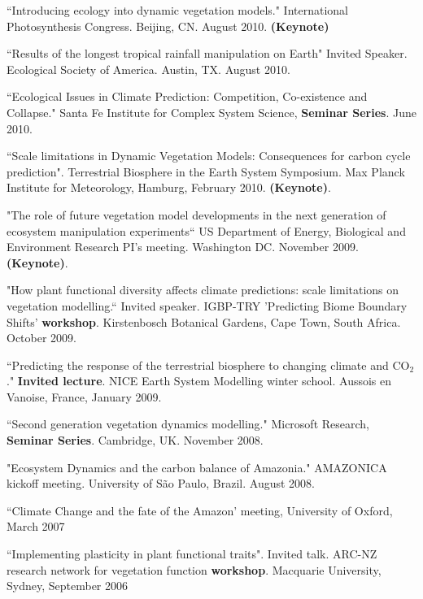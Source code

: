 \documentclass[10pt]{article}
\newenvironment{lonelist}[1][\enskip\textbullet]%
        {\vspace{-\baselineskip}\begin{list}{#1}{%
        \setlength{\itemindent}{-3pt} 
        \setlength{\partopsep}{0pt}%
        \setlength{\leftmargin}{10pt}
        \setlength{\topsep}{15pt}}}
        {\end{list}\vspace{-.3\baselineskip}}
\begin{document}
\begin{lonelist}
\begin{lonelist}
\item ``Introducing ecology into dynamic vegetation models."  International Photosynthesis Congress. Beijing, CN. August 2010. \textbf{(Keynote)} 

\item ``Results of the longest tropical rainfall manipulation on Earth" Invited Speaker. Ecological Society of America. Austin, TX.  August 2010.

\item ``Ecological Issues in Climate Prediction: Competition, Co-existence and Collapse." Santa Fe Institute for Complex System Science, \textbf{Seminar Series}. June 2010. 

\item ``Scale limitations in Dynamic Vegetation Models: Consequences for carbon cycle prediction". Terrestrial Biosphere in the Earth System Symposium. Max Planck Institute for Meteorology, Hamburg, February 2010. \textbf{(Keynote)}.

\item "The role of future vegetation model developments in the next generation of ecosystem manipulation experiments``  US Department of Energy, Biological and Environment Research PI's meeting. Washington DC. November 2009.\textbf{(Keynote)}.

\item "How plant functional diversity affects climate predictions:  scale limitations on vegetation modelling.``  Invited speaker.  IGBP-TRY 'Predicting Biome Boundary Shifts' \textbf{workshop}. Kirstenbosch Botanical Gardens, Cape Town, South Africa. October 2009.

\item ``Predicting the response of the terrestrial biosphere to changing climate and CO$_{2}$." \textbf{Invited lecture}.  NICE Earth System Modelling winter school. Aussois en Vanoise, France, January 2009. 

\item ``Second generation vegetation dynamics modelling." Microsoft Research, \textbf{Seminar Series}.  Cambridge, UK. November 2008.

\item "Ecosystem Dynamics and the carbon balance of Amazonia."  AMAZONICA kickoff meeting. University of S\~{a}o Paulo, Brazil. August 2008.

\item ``Climate Change and the fate of the Amazon' meeting, University of Oxford, March 2007

\item ``Implementing plasticity in plant functional traits". Invited talk.  ARC-NZ research network for vegetation function \textbf{workshop}. Macquarie 	University, Sydney, September 2006

\end{lonelist}




 

\end{lonelist}
\end{document}
